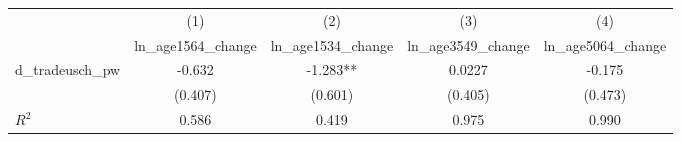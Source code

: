 {
\def\sym#1{\ifmmode^{#1}\else\(^{#1}\)\fi}
\begin{tabular}{l*{4}{c}}
\hline\hline
                    &\multicolumn{1}{c}{(1)}&\multicolumn{1}{c}{(2)}&\multicolumn{1}{c}{(3)}&\multicolumn{1}{c}{(4)}\\
                    &\multicolumn{1}{c}{ln\_age1564\_change}&\multicolumn{1}{c}{ln\_age1534\_change}&\multicolumn{1}{c}{ln\_age3549\_change}&\multicolumn{1}{c}{ln\_age5064\_change}\\
\hline
d\_tradeusch\_pw      &      -0.632   &      -1.283** &      0.0227   &      -0.175   \\
                    &     (0.407)   &     (0.601)   &     (0.405)   &     (0.473)   \\
\hline
\(R^{2}\)           &       0.586   &       0.419   &       0.975   &       0.990   \\
\hline\hline
\end{tabular}
}
